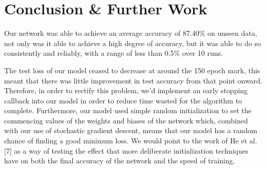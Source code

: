 \documentclass[journal]{IEEEtran}
\begin{document}

\section{Conclusion \& Further Work}

Our network was able to achieve an average accuracy of 87.40\% on unseen data, not only was it able to achieve a high degree of accuracy, but it was able to do so consistently and reliably, with a range of less than 0.5\% over 10 runs. \par
The test loss of our model ceased to decrease at around the 150 epoch mark, this meant that there was little improvement in test accuracy from that point onward. Therefore, in order to rectify this problem, we'd implement an early stopping callback into our model in order to reduce time wasted for the algorithm to complete. Furthermore, our model used simple random initialization to set the commencing values of the weights and biases of the network which, combined with our use of stochastic gradient descent, means that our model has a random chance of finding a good minimum loss. We would point to the work of He et al. [7] as a way of testing the effect that more deliberate initialization techniques have on both the final accuracy of the network and the speed of training.


\ifCLASSOPTIONcaptionsoff
  \newpage
\fi
\end{document}
